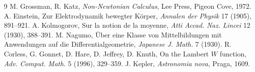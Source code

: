 \documentclass[11pt,a4paper]{article}
\begin{document}
\begin{thebibliography}{9}
 M. Grossman, R. Katz, \emph{Non-Newtonian Calculus},
Lee Press, Pigeon Cove, 1972.
 A. Einstein, Zur Elektrodynamik bewegter Körper,
\emph{Annalen der Physik} 17 (1905), 891--921.
 A. Kolmogorov, Sur la notion de la moyenne,
\emph{Atti Accad. Naz. Lincei} 12 (1930), 388--391.
 M. Nagumo, Über eine Klasse von Mittelbildungen mit
Anwendungen auf die Differentialgeometrie, \emph{Japanese J. Math.} 7 (1930).
 R. Corless, G. Gonnet, D. Hare, D. Jeffrey, D. Knuth,
On the Lambert $W$ function, \emph{Adv. Comput. Math.} 5 (1996), 329--359.
 J. Kepler, \emph{Astronomia nova}, Praga, 1609.
\end{thebibliography}
\end{document}
